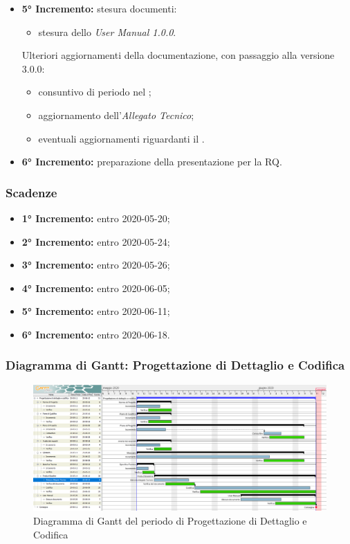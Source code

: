\begin{itemize}
				\item \textbf{5° Incremento:} stesura documenti:
				\begin{itemize}
					\item stesura dello \textit{User Manual 1.0.0}.
				\end{itemize}
				Ulteriori aggiornamenti della documentazione, con passaggio alla versione 3.0.0:%
					\begin{itemize}
						\item consuntivo di periodo nel \PdP{};
						\item aggiornamento dell'\textit{Allegato Tecnico};
						\item eventuali aggiornamenti riguardanti il \Glossario{}.
					\end{itemize}
				\item \textbf{6° Incremento:} preparazione della presentazione per la RQ.
			\end{itemize}
		\subsubsection{Scadenze}
			\begin{itemize}
				\item \textbf{1° Incremento:} entro 2020-05-20;
				\item \textbf{2° Incremento:} entro 2020-05-24;
				\item \textbf{3° Incremento:} entro 2020-05-26;
				\item \textbf{4° Incremento:} entro 2020-06-05;
				\item \textbf{5° Incremento:} entro 2020-06-11;
				\item \textbf{6° Incremento:} entro 2020-06-18.
			\end{itemize}
	\subsubsection{Diagramma di Gantt: Progettazione di Dettaglio e Codifica}
		\begin{figure}[h]
			\centering
			\includegraphics[width=1.1\textwidth]{./res/img/DiagrammiGantt/prog_dett_gantt.png}
			\caption{Diagramma di Gantt del periodo di Progettazione di Dettaglio e Codifica}
		\end{figure}
\newpage
